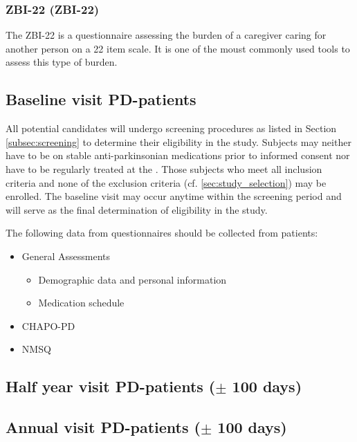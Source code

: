 \subsubsection{\acl{ZBI-22} (\acs{ZBI-22})}
The \ac{ZBI-22} is a questionnaire assessing the burden of a caregiver caring for another person on a 22 item scale. It is one of the moust commonly used tools to assess this type of burden. %

\subsection{Baseline visit \ac{PD}-patients}
All potential candidates will undergo screening procedures as listed in Section \ref{subsec:screening} to determine their eligibility in the study. Subjects may neither have to be on stable anti-parkinsonian medications prior to informed consent nor have to be regularly treated at the \UKGM. Those subjects who meet all inclusion criteria and none of the exclusion criteria (cf. \ref{sec:study_selection}) may be enrolled. The baseline visit may occur anytime within the screening period and will serve as the final  determination of eligibility in the study. 

The following data from questionnaires should be collected from patients:
\begin{itemize}
\item General Assessments
\begin{itemize}
\item Demographic data and personal information
\item Medication schedule
\end{itemize}
\item \ac{CHAPO-PD}
\item \ac{NMSQ}
\end{itemize}


\subsection{Half year visit \ac{PD}-patients ($\pm$ 100 days)}

\subsection{Annual visit \ac{PD}-patients ($\pm$ 100 days)}

